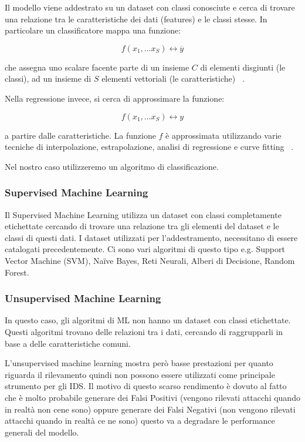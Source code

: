 Il modello viene addestrato su un dataset con classi conosciute e cerca di trovare una relazione tra le caratteristiche dei dati (features) e le classi stesse. 
In particolare un classificatore mappa una funzione: 

\[
  f(x_1,\ldots x_S) \leftrightarrow \overline{y}
\]

che assegna uno scalare facente parte di un insieme $C$ di elementi disgiunti (le classi), ad un insieme di $S$ elementi vettoriali (le caratteristiche) ~\cite{hoffmannBenchmarkingClassificationRegression2019}.


Nella regressione invece, si cerca di approssimare la funzione: 

\[
f(x_1,\ldots x_S) \leftrightarrow y
\]

a partire dalle caratteristiche. La funzione $f$ è approssimata utilizzando varie tecniche di interpolazione, estrapolazione, analisi di regressione e curve fitting ~\cite{hoffmannBenchmarkingClassificationRegression2019}.


Nel nostro caso utilizzeremo un algoritmo di classificazione.




\subsubsection{Supervised Machine Learning}

Il Supervised Machine Learning utilizza un dataset con classi completamente etichettate cercando di trovare una relazione tra gli elementi del dataset e le classi di questi dati. 
I dataset utilizzati per l'addestramento, necessitano di essere catalogati precedentemente.
Ci sono vari algoritmi di questo tipo e.g. Support Vector Machine (SVM), Naïve Bayes, Reti Neurali, Alberi di Decisione, Random Forest.


\subsubsection{Unsupervised Machine Learning}

In questo caso, gli algoritmi di ML non hanno un dataset con classi etichettate. Questi algoritmi trovano delle relazioni tra i dati, cercando di raggrupparli in base a delle caratteristiche comuni.

L'unsupervised machine learning mostra però basse prestazioni per quanto riguarda il rilevamento quindi non possono essere utilizzati come principale strumento per gli IDS. Il motivo di questo scarso rendimento è dovuto al fatto che è molto probabile generare dei Falsi Positivi (vengono rilevati attacchi quando in realtà non cene sono) oppure generare dei Falsi Negativi (non vengono rilevati attacchi quando in realtà ce ne sono) questo va a degradare le performance generali del modello.

